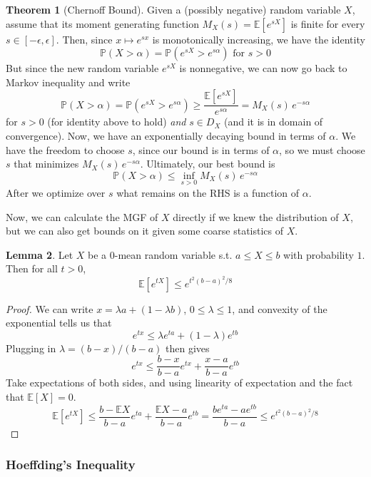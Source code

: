 \documentclass{article}
\theoremstyle{definition}
\newtheorem{theorem}{Theorem}[section]
\newtheorem{lemma}[theorem]{Lemma}
\theoremstyle{remark}
\theoremstyle{definition}
\begin{document}
\begin{theorem}[Chernoff Bound]
Given a (possibly negative) random variable $X$, assume that its moment generating function $M_X (s) = \mathbb{E}[e^{s X}]$ is finite for every $s \in [-\epsilon, \epsilon]$. Then, since $x \mapsto e^{s x}$ is monotonically increasing, we have the identity 
\[\mathbb{P}(X > \alpha) = \mathbb{P}(e^{s X} > e^{s \alpha}) \text{ for } s > 0\]
But since the new random variable $e^{s X}$ is nonnegative, we can now go back to Markov inequality and write 
\[\mathbb{P}(X > \alpha) = \mathbb{P}(e^{s X} > e^{s \alpha}) \geq \frac{\mathbb{E}[e^{s X}]}{e^{s \alpha}} = M_X (s) \, e^{-s \alpha}\]
for $s > 0$ (for identity above to hold) \textit{and} $s \in D_X$ (and it is in domain of convergence). Now, we have an exponentially decaying bound in terms of $\alpha$. We have the freedom to choose $s$, since our bound is in terms of $\alpha$, so we must choose $s$ that minimizes $M_X (s) \, e^{-s \alpha}$. Ultimately, our best bound is 
\[\mathbb{P}(X > \alpha) \leq \inf_{s > 0} M_X (s) \, e^{-s \alpha}\]
After we optimize over $s$ what remains on the RHS is a function of $\alpha$. 
\end{theorem}

Now, we can calculate the MGF of $X$ directly if we knew the distribution of $X$, but we can also get bounds on it given some coarse statistics of $X$. 

\begin{lemma}
Let $X$ be a $0$-mean random variable s.t. $a \leq X \leq b$ with probability $1$. Then for all $t > 0$, 
\[\mathbb{E}[ e^{t X}] \leq e^{t^2 (b - a)^2 / 8}\]
\end{lemma}
\begin{proof}
We can write $x = \lambda a + (1 - \lambda b)$, $0 \leq \lambda \leq 1$, and convexity of the exponential tells us that 
\[e^{tx} \leq \lambda e^{ta} + (1 - \lambda) e^{tb}\]
Plugging in $\lambda = (b - x) / (b - a)$ then gives 
\[e^{tx} \leq \frac{b - x}{b - a} e^{tx} + \frac{x - a}{b - a} e^{tb} \]
Take expectations of both sides, and using linearity of expectation and the fact that $\mathbb{E}[X] = 0$. 
\[\mathbb{E}[e^{tX}] \leq \frac{b - \mathbb{E} X}{b - a} e^{ta} + \frac{\mathbb{E} X - a}{b - a} e^{tb} = \frac{b e^{ta} - a e^{tb}}{b - a} \leq e^{t^2 (b - a)^2 / 8}\]
\end{proof}

\subsubsection{Hoeffding's Inequality}
\end{document}
